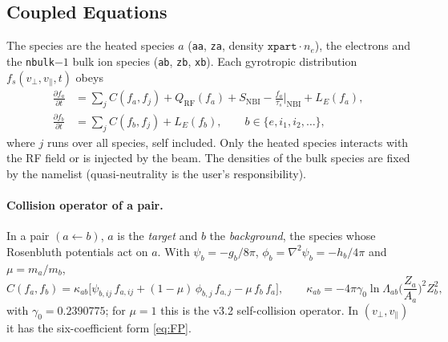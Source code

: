 \documentclass[11pt,a4paper]{article}
\newcommand{\vp}{v_\perp}
\newcommand{\vpa}{v_\parallel}
\begin{document}
\subsection{Coupled Equations}

The species are the heated species $a$ (\texttt{aa}, \texttt{za}, density
$\texttt{xpart}\cdot n_e$), the electrons and the \texttt{nbulk}$-1$ bulk ion species (\texttt{ab},
\texttt{zb}, \texttt{xb}).  Each gyrotropic distribution $f_s(\vp,\vpa,t)$ obeys
\begin{align}
\frac{\partial f_a}{\partial t}&=\sum_jC(f_a,f_j)+Q_\mathrm{RF}(f_a)+S_\mathrm{NBI}
  -\frac{f_a}{\tau_s}\Big|_\mathrm{NBI}+L_E(f_a),\\
\frac{\partial f_b}{\partial t}&=\sum_jC(f_b,f_j)+L_E(f_b),\qquad b\in\{e,i_1,i_2,\dots\},
\end{align}
where $j$ runs over all species, self included.  Only the heated species interacts with the RF
field or is injected by the beam.  The densities of the bulk species are fixed by the namelist
(quasi-neutrality is the user's responsibility).

\paragraph{Collision operator of a pair.}
In a pair $(a\leftarrow b)$, $a$ is the \emph{target} and $b$ the \emph{background}, the species whose
Rosenbluth potentials act on $a$.  With $\psi_b=-g_b/8\pi$, $\phi_b=\nabla^2\psi_b=-h_b/4\pi$ and
$\mu=m_a/m_b$,
\begin{equation}
C(f_a,f_b)=\kappa_{ab}\Big[\psi_{b,ij}\,f_{a,ij}+(1-\mu)\,\phi_{b,j}\,f_{a,j}-\mu\,f_b\,f_a\Big],\qquad
\kappa_{ab}=-4\pi\gamma_0\ln\Lambda_{ab}\Big(\frac{Z_a}{A_a}\Big)^2Z_b^2,
\end{equation}
with $\gamma_0=0.2390775$; for $\mu=1$ this is the v3.2 self-collision operator.  In $(\vp,\vpa)$ it
has the six-coefficient form \eqref{eq:FP}.
\end{document}
